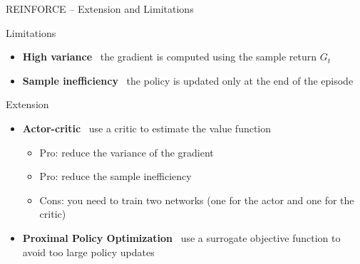 \documentclass[presentation, 9pt]{beamer}\mode<presentation>{\usetheme{AMSBolognaFC}}
\begin{document}
\begin{frame}{REINFORCE -- Extension and Limitations}
\begin{exampleblock}{Limitations}
	\begin{itemize}
		\item \textbf{High variance} \faArrowRight \, the gradient is computed using the sample return $G_t$
		\item \textbf{Sample inefficiency} \faArrowRight \, the policy is updated only at the end of the episode
	\end{itemize}
\end{exampleblock}
\begin{exampleblock}{Extension}
	\begin{itemize}
		\item \textbf{Actor-critic} \faArrowRight \, use a critic to estimate the value function
		\begin{itemize}
			\item Pro: reduce the variance of the gradient
			\item Pro: reduce the sample inefficiency
			\item Cons: you need to train two networks (one for the actor and one for the critic)
		\end{itemize}
		\item \textbf{Proximal Policy Optimization} \faArrowRight \, use a surrogate objective function to avoid too large policy updates
	\end{itemize}
\end{exampleblock}
\end{frame}
\section*{}

\frame{\titlepage}

\section*{\refname}



\end{document}
